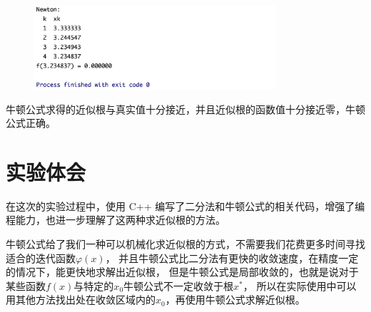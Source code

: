 \documentclass[lang=cn,11pt,a4paper]{elegantpaper}
\begin{document}
\begin{figure}[htbp]
  \centering
  \includegraphics[width=0.8\textwidth]{image/r.png}
\end{figure}

牛顿公式求得的近似根与真实值十分接近，并且近似根的函数值十分接近零，牛顿公式正确。

\section{实验体会}
在这次的实验过程中，使用 C++ 编写了二分法和牛顿公式的相关代码，增强了编程能力，也进一步理解了这两种求近似根的方法。

牛顿公式给了我们一种可以机械化求近似根的方式，不需要我们花费更多时间寻找适合的迭代函数$\varphi(x)$，
并且牛顿公式比二分法有更快的收敛速度，在精度一定的情况下，能更快地求解出近似根，
但是牛顿公式是局部收敛的，也就是说对于某些函数$f(x)$与特定的$x_0$牛顿公式不一定收敛于根$x^*$，
所以在实际使用中可以用其他方法找出处在收敛区域内的$x_0$，再使用牛顿公式求解近似根。
\end{document}
